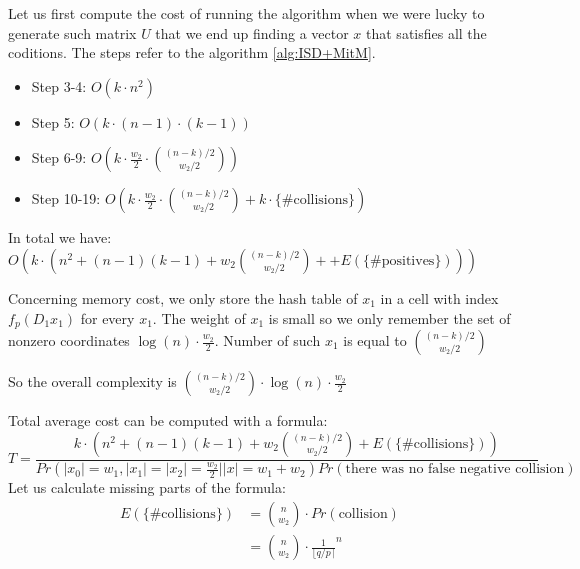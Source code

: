 \documentclass[12pt]{article}
\begin{document}
Let us first compute the cost of running the algorithm when we were lucky to generate such matrix $U$ that we end up finding a vector $x$ that satisfies all the coditions. The steps refer to the algorithm \ref{alg:ISD+MitM}.
\begin{itemize}
    \item Step 3-4: $O(k \cdot n^2)$
    \item Step 5: $O(k \cdot (n-1) \cdot (k-1))$
    \item Step 6-9: $O(k \cdot \frac{w_2}{2} \cdot \binom{(n-k)/2}{w_2/2})$
    \item Step 10-19: $O(k \cdot \frac{w_2}{2} \cdot \binom{(n-k)/2}{w_2/2} + k \cdot \{\text{\# collisions}\})$
\end{itemize}
In total we have: $O(k \cdot (n^2 + (n-1)(k-1) + w_2\binom{(n-k)/2}{w_2/2} + + E(\{\text{\# positives}\})))$

Concerning memory cost, we only store the hash table of $x_1$ in a cell with index $f_{p}(D_1x_1)$ for every $x_1$.
The weight of $x_1$ is small so we only remember the set of nonzero coordinates $\log(n) \cdot \frac{w_2}{2}$. Number of such $x_1$ is equal to $\binom{(n-k)/2}{w_2/2}$

So the overall complexity is  $\binom{(n-k)/2}{w_2/2} \cdot \log(n) \cdot \frac{w_2}{2}$

Total average cost can be computed with a formula:
\[
    T = \frac{k \cdot (n^2 + (n-1)(k-1) + w_2\binom{(n-k)/2}{w_2/2} + E(\{\text{\# collisions}\}))}{Pr(|x_0| = w_1, |x_1| = |x_2| = \frac{w_2}{2} | |x| = w_1+w_2)Pr(\text{there was no false negative collision})}
\]
Let us calculate missing parts of the formula:
\[
\begin{split}
    E(\{\text{\# collisions}\}) & = \binom{n}{w_2} \cdot Pr(\text{collision}) \\
    & =  \binom{n}{w_2} \cdot  \frac{1}{\lfloor q/p \rceil}^{n}
\end{split}
\]
\end{document}
